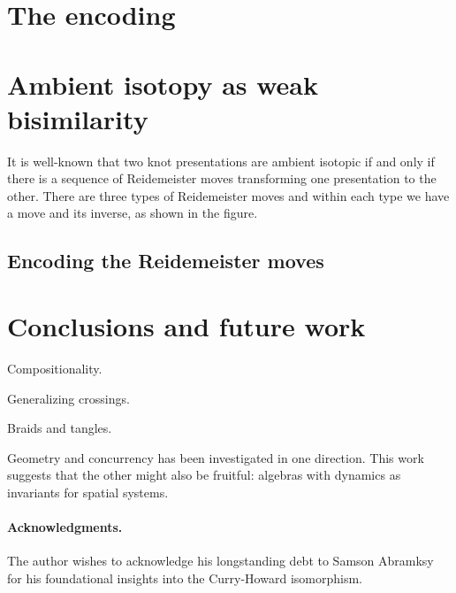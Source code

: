 \documentclass[]{llncs}
\begin{document}
\section{The encoding}


\section{Ambient isotopy as weak bisimilarity}

It is well-known that two knot presentations are ambient isotopic if
and only if there is a sequence of Reidemeister moves transforming one
presentation to the other. There are three types of Reidemeister moves
and within each type we have a move and its inverse, as shown in the
figure.




\subsection{Encoding the Reidemeister moves}



\section{Conclusions and future work}

Compositionality.

Generalizing crossings.

Braids and tangles.

Geometry and concurrency has been investigated in one direction. This
work suggests that the other might also be fruitful: algebras with dynamics as invariants for
spatial systems.

\paragraph{Acknowledgments.}
The author wishes to acknowledge his longstanding debt to Samson
Abramksy for his foundational insights into the Curry-Howard
isomorphism.





\end{document}
